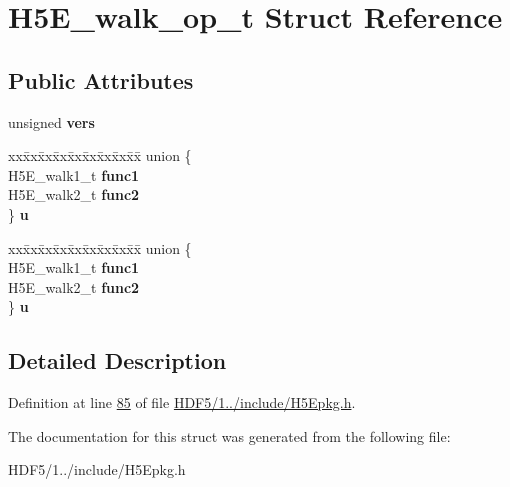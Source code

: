 \hypertarget{struct_h5_e__walk__op__t}{}\section{H5\+E\+\_\+walk\+\_\+op\+\_\+t Struct Reference}
\label{struct_h5_e__walk__op__t}
\subsection*{Public Attributes}
\begin{DoxyCompactItemize}
\item 
\mbox{\label{struct_h5_e__walk__op__t_af3bbde70ee817a52d6f61b2f46162f98}} 
unsigned {\bfseries vers}
\item 
\mbox{\label{struct_h5_e__walk__op__t_aa1de7ee0a1e59d90657cb3d0b8b43bb4}} 
\begin{tabbing}
xx\=xx\=xx\=xx\=xx\=xx\=xx\=xx\=xx\=\kill
union \{\\
\>H5E\_walk1\_t {\bfseries func1}\\
\>H5E\_walk2\_t {\bfseries func2}\\
\} {\bfseries u}\\

\end{tabbing}\item 
\mbox{\label{struct_h5_e__walk__op__t_ac37845da2126fd0ccce2b6bdaeb1d226}} 
\begin{tabbing}
xx\=xx\=xx\=xx\=xx\=xx\=xx\=xx\=xx\=\kill
union \{\\
\>H5E\_walk1\_t {\bfseries func1}\\
\>H5E\_walk2\_t {\bfseries func2}\\
\} {\bfseries u}\\

\end{tabbing}\end{DoxyCompactItemize}


\subsection{Detailed Description}


Definition at line \hyperlink{_h_d_f5_21_810_81_2include_2_h5_epkg_8h_source_l00085}{85} of file \hyperlink{_h_d_f5_21_810_81_2include_2_h5_epkg_8h_source}{H\+D\+F5/1../include/\+H5\+Epkg.\+h}.



The documentation for this struct was generated from the following file\+:\begin{DoxyCompactItemize}
\item 
H\+D\+F5/1../include/\+H5\+Epkg.\+h\end{DoxyCompactItemize}
